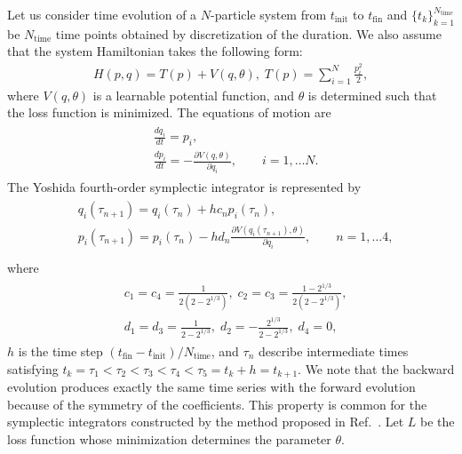 Let us consider time evolution of a $N$-particle system from $t_{\mathrm{init}}$ to $t_{\mathrm{fin}}$ and $\{t_k\}_{k=1}^{N_{\mathrm{time}}}$ be $N_{\mathrm{time}}$ time points obtained by discretization of the duration.
We also assume that the system Hamiltonian takes the following form:
\begin{align}
    H(p,q) = T(p) + V(q,\theta), \; T(p) = \sum_{i=1}^{N}\frac{p_i^2}{2},
\end{align}
where $V(q,\theta)$ is a learnable potential function, and $\theta$ is determined such that the loss function is minimized.
The equations of motion are
\begin{align}
  \begin{split}
    & \frac{dq_i}{dt} = p_i, \\
    & \frac{dp_i}{dt} = -\frac{\partial V(q,\theta)}{\partial q_i}, \qquad i = 1, \ldots N.
  \end{split}
\end{align}
The Yoshida fourth-order symplectic integrator is represented by~\cite{Yoshida1990}
\begin{align}
  \begin{split}
    & q_i(\tau_{n+1}) = q_i(\tau_{n}) + h c_n p_i(\tau_{n}), \\
    & p_i(\tau_{n+1}) = p_i(\tau_{n}) - h d_n \frac{\partial V(q_i(\tau_{n+1}),\theta)}{\partial q_i}, \qquad n = 1, \ldots 4, \\
  \end{split}\label{eq:Yoshida_algorithm}
\end{align}
where
\begin{align}
  \begin{split}
    & c_1 = c_4 = \frac{1}{2(2-2^{1/3})}, \;   c_2 = c_3 = \frac{1-2^{1/3}}{2(2-2^{1/3})},  \\
    & d_1 = d_3 = \frac{1}{2-2^{1/3}}, \;   d_2 = -\frac{2^{1/3}}{2-2^{1/3}}, \;  d_4 = 0,
  \end{split} \label{eq:coefficients_neri}
\end{align}
$h$ is the time step $(t_{\mathrm{fin}} - t_{\mathrm{init}})/N_\mathrm{time}$, and $\tau_n$ describe intermediate times satisfying $t_k = \tau_1 < \tau_2 < \tau_3 < \tau_4 < \tau_5 = t_{k} + h = t_{k+1}$.
We note that the backward evolution produces exactly the same time series with the forward evolution because of the symmetry of the coefficients.
This property is common for the symplectic integrators constructed by the method proposed in Ref.~.
Let $L$ be the loss function whose minimization determines the parameter $\theta$.

